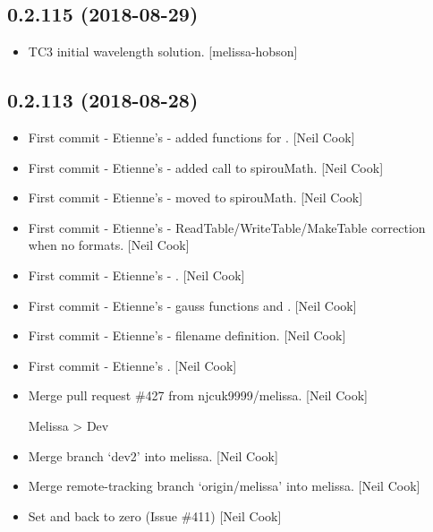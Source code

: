 \documentclass[a4paper,10pt,english]{report}
\begin{document}
\subsection{0.2.115 (2018-08-29)}
\label{\detokenize{misc/changelog:id347}}\begin{itemize}
\item {} 
TC3 initial wavelength solution. {[}melissa-hobson{]}

\end{itemize}


\subsection{0.2.113 (2018-08-28)}
\label{\detokenize{misc/changelog:id348}}\begin{itemize}
\item {} 
First commit - Etienne’s  - added functions for . {[}Neil
Cook{]}

\item {} 
First commit - Etienne’s  - added call to spirouMath. {[}Neil
Cook{]}

\item {} 
First commit - Etienne’s  - moved  to spirouMath. {[}Neil
Cook{]}

\item {} 
First commit - Etienne’s  - ReadTable/WriteTable/MakeTable
correction when no formats. {[}Neil Cook{]}

\item {} 
First commit - Etienne’s  - . {[}Neil Cook{]}

\item {} 
First commit - Etienne’s  - gauss functions and . {[}Neil
Cook{]}

\item {} 
First commit - Etienne’s  - filename definition. {[}Neil Cook{]}

\item {} 
First commit - Etienne’s . {[}Neil Cook{]}

\item {} 
Merge pull request \#427 from njcuk9999/melissa. {[}Neil Cook{]}

Melissa \textendash{}\textgreater{} Dev

\item {} 
Merge branch ‘dev2’ into melissa. {[}Neil Cook{]}

\item {} 
Merge remote-tracking branch ‘origin/melissa’ into melissa. {[}Neil
Cook{]}

\item {} 
Set  and  back to zero (Issue \#411)
{[}Neil Cook{]}

\end{itemize}
\end{document}
